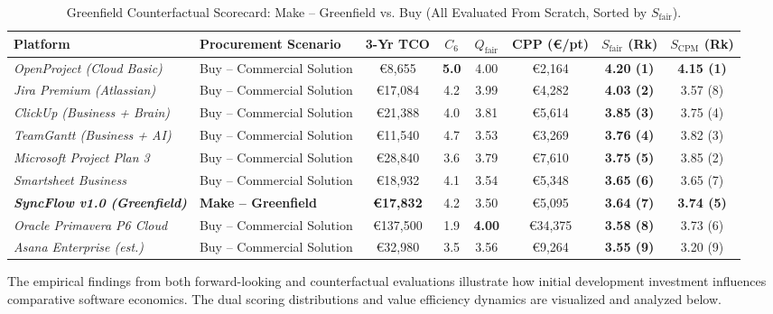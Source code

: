 \begin{table}[H]
\vspace{1.5mm}

\setlength{\tabcolsep}{3.0pt}
\caption*{Greenfield Counterfactual Scorecard: Make -- Greenfield vs. Buy (All Evaluated From Scratch, Sorted by $S_{\text{fair}}$).}
\begin{tabularx}{\textwidth}{>{\raggedright\arraybackslash}X l c c c c c c}
\toprule
\textbf{Platform} & \textbf{Procurement Scenario} & \textbf{3-Yr TCO} & \textbf{$C_6$} & \textbf{$Q_{\text{fair}}$} & \textbf{CPP (€/pt)} & \textbf{$S_{\text{fair}}$ (Rk)} & \textbf{$S_{\text{CPM}}$ (Rk)} \\
\midrule
\textit{OpenProject (Cloud Basic)} & Buy -- Commercial Solution & €8,655 & \textbf{5.0} & 4.00 & €2,164 & \textbf{4.20 (1)} & \textbf{4.15 (1)} \\
\textit{Jira Premium (Atlassian)} & Buy -- Commercial Solution & €17,084 & 4.2 & 3.99 & €4,282 & \textbf{4.03 (2)} & 3.57 (8) \\
\textit{ClickUp (Business + Brain)} & Buy -- Commercial Solution & €21,388 & 4.0 & 3.81 & €5,614 & \textbf{3.85 (3)} & 3.75 (4) \\
\textit{TeamGantt (Business + AI)} & Buy -- Commercial Solution & €11,540 & 4.7 & 3.53 & €3,269 & \textbf{3.76 (4)} & 3.82 (3) \\
\textit{Microsoft Project Plan 3} & Buy -- Commercial Solution & €28,840 & 3.6 & 3.79 & €7,610 & \textbf{3.75 (5)} & 3.85 (2) \\
\textit{Smartsheet Business} & Buy -- Commercial Solution & €18,932 & 4.1 & 3.54 & €5,348 & \textbf{3.65 (6)} & 3.65 (7) \\
\textbf{\textit{SyncFlow v1.0 (Greenfield)}} & \textbf{Make -- Greenfield} & \textbf{€17,832} & 4.2 & 3.50 & €5,095 & \textbf{3.64 (7)} & \textbf{3.74 (5)} \\
\textit{Oracle Primavera P6 Cloud} & Buy -- Commercial Solution & €137,500 & 1.9 & \textbf{4.00} & €34,375 & \textbf{3.58 (8)} & 3.73 (6) \\
\textit{Asana Enterprise (est.)} & Buy -- Commercial Solution & €32,980 & 3.5 & 3.56 & €9,264 & \textbf{3.55 (9)} & 3.20 (9) \\
\bottomrule
\end{tabularx}
\end{table}

The empirical findings from both forward-looking and counterfactual evaluations illustrate how initial development investment influences comparative software economics. The dual scoring distributions and value efficiency dynamics are visualized and analyzed below.

